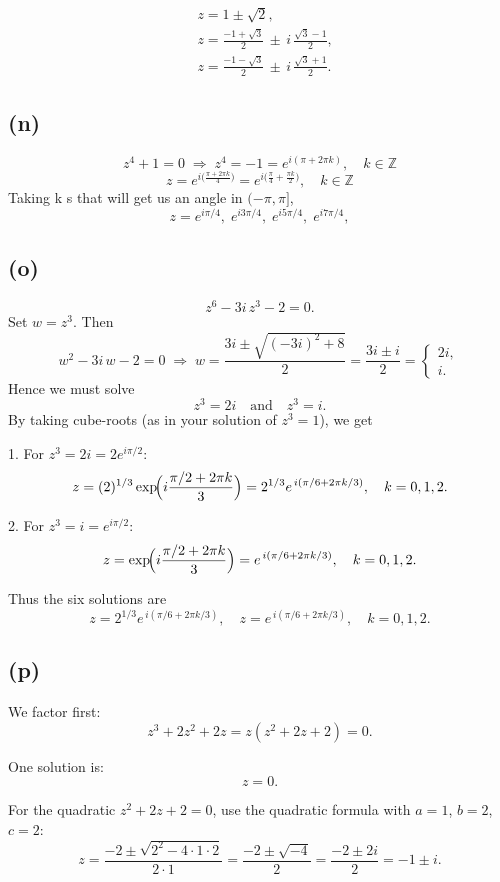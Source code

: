\documentclass{article}
\begin{document}
\[
\boxed{
\begin{aligned}
&z = 1 \pm \sqrt2,\\
&z = \frac{-1 + \sqrt3}{2}\,\pm\,i\,\frac{\sqrt3 - 1}{2},\\
&z = \frac{-1 - \sqrt3}{2}\,\pm\,i\,\frac{\sqrt3 + 1}{2}.
\end{aligned}
}
\]
\subsection*{(n)}
\[
z^4 + 1 = 0
\;\Longrightarrow\;
z^4 = -1 = e^{i(\pi + 2\pi k)},\quad k\in \mathbb{Z}
\]
\[
z = e^{i\bigl(\frac{\pi + 2\pi k}{4}\bigr)}
    = e^{i\bigl(\tfrac\pi4 + \tfrac{\pi k}{2}\bigr)},
\quad k\in \mathbb{Z}
\]
Taking k s that will get us an angle in  $(-\pi,\pi]$,
\[
z = e^{i\pi/4},\; e^{i3\pi/4},\; e^{i5\pi/4},\; e^{i7\pi/4},
\]
\subsection*{(o)}
\[
z^6 - 3i\,z^3 - 2 = 0.
\]
Set \(w = z^3\).  Then
\[
w^2 - 3i\,w - 2 = 0
\;\Longrightarrow\;
w = \frac{3i \pm \sqrt{(-3i)^2 + 8}}{2}
= \frac{3i \pm i}{2}
= \begin{cases}2i,\\[4pt]i.\end{cases}
\]
Hence we must solve
\[
z^3 = 2i
\quad\text{and}\quad
z^3 = i.
\]
By taking cube-roots (as in your solution of \(z^3=1\)), we get

1. For \(z^3=2i=2e^{i\pi/2}\):
\[
z = (2)^{1/3} \exp\!\Bigl(i\frac{\pi/2 + 2\pi k}{3}\Bigr)
= 2^{1/3}e^{\,i(\pi/6 + 2\pi k/3)},\quad k=0,1,2.
\]

2. For \(z^3=i=e^{i\pi/2}\):
\[
z = \exp\!\Bigl(i\frac{\pi/2 + 2\pi k}{3}\Bigr)
= e^{\,i(\pi/6 + 2\pi k/3)},\quad k=0,1,2.
\]

Thus the six solutions are
\[
\boxed{
z = 2^{1/3}e^{\,i(\pi/6 + 2\pi k/3)},\quad
z = e^{\,i(\pi/6 + 2\pi k/3)},
\quad k=0,1,2.
}
\]
\subsection*{(p)}
We factor first:
\[
z^3 + 2z^2 + 2z = z(z^2 + 2z + 2) = 0.
\]

One solution is:
\[
z = 0.
\]

For the quadratic \(z^2 + 2z + 2 = 0\), use the quadratic formula with \(a = 1\), \(b = 2\), \(c = 2\):
\[
z = \frac{-2 \pm \sqrt{2^2 - 4 \cdot 1 \cdot 2}}{2 \cdot 1}
= \frac{-2 \pm \sqrt{-4}}{2}
= \frac{-2 \pm 2i}{2}
= -1 \pm i.
\]
\end{document}
